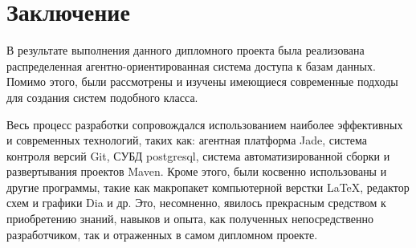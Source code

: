 \section*{Заключение}
В результате выполнения данного дипломного проекта была реализована распределенная агентно-ориентированная система доступа к базам данных. Помимо этого, были рассмотрены и изучены имеющиеся современные подходы для создания систем подобного класса.

Весь процесс разработки сопровождался использованием наиболее эффективных и современных технологий, таких как: агентная платформа Jade, система контроля версий Git, СУБД postgresql, система автоматизированной сборки и развертывания проектов Maven. Кроме этого, были косвенно использованы и другие программы, такие как макропакет компьютерной верстки LaTeX, редактор схем и графики Dia и др. Это, несомненно, явилось прекрасным средством к приобретению знаний, навыков и опыта, как полученных непосредственно разработчиком, так и отраженных в самом дипломном проекте.
